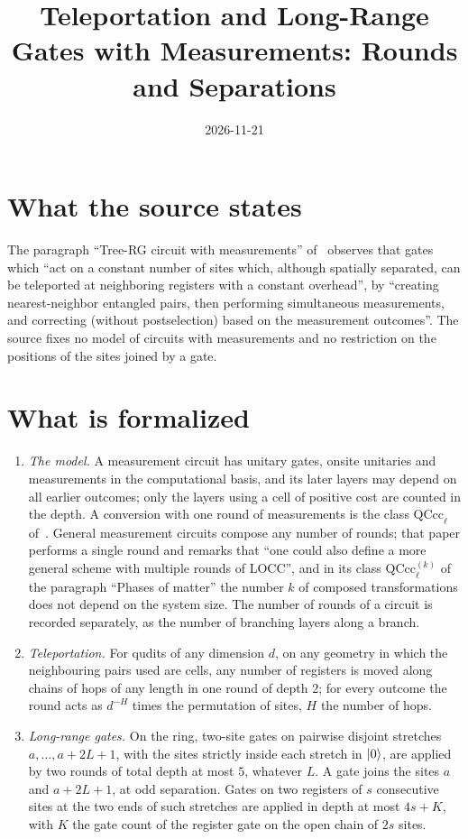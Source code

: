 \documentclass{article}
\title{Teleportation and Long-Range Gates with Measurements: Rounds and Separations}
\author{}
\date{2026-11-21}
\begin{document}
\maketitle
{}

\section{What the source states}
The paragraph ``Tree-RG circuit with measurements'' of~\cite{Malz2024Preparation}
observes that gates which ``act on a constant number of sites which, although
spatially separated, can be teleported at neighboring registers with a constant
overhead'', by ``creating nearest-neighbor entangled pairs, then performing
simultaneous measurements, and correcting (without postselection) based on the
measurement outcomes''. The source fixes no model of circuits with
measurements and no restriction on the positions of the sites joined by a
gate.

\section{What is formalized}
\begin{enumerate}
    \item \emph{The model.} A measurement circuit has unitary gates, onsite
          unitaries and measurements in the computational basis, and its later
          layers may depend on all earlier outcomes; only the layers using a
          cell of positive cost are counted in the depth. A conversion with one
          round of measurements is the class $\mathrm{QCcc}_\ell$
          of~\cite{Piroli2021LOCC}. General measurement circuits compose any
          number of rounds; that paper performs a single round and remarks that
          ``one could also define a more general scheme with multiple rounds of
          LOCC'', and in its class $\mathrm{QCcc}^{(k)}_\ell$ of the paragraph
          ``Phases of matter'' the number $k$ of composed transformations does
          not depend on the system size. The number of rounds of a circuit is
          recorded separately, as the number of branching layers along a branch.
    \item \emph{Teleportation.} For qudits of any dimension $d$, on any
          geometry in which the neighbouring pairs used are cells, any number of
          registers is moved along chains of hops of any length in one round of
          depth $2$; for every outcome the round acts as $d^{-H}$ times the
          permutation of sites, $H$ the number of hops.
    \item \emph{Long-range gates.} On the ring, two-site gates on pairwise
          disjoint stretches $a,\dots,a+2L+1$, with the sites strictly inside
          each stretch in $|0\rangle$, are applied by two rounds of total depth at
          most $5$, whatever $L$. A gate joins the sites $a$ and $a+2L+1$, at odd
          separation. Gates on two registers of $s$ consecutive sites at the two
          ends of such stretches are applied in depth at most $4s+K$, with $K$ the
          gate count of the register gate on the open chain of $2s$ sites.
\end{enumerate}
\end{document}
